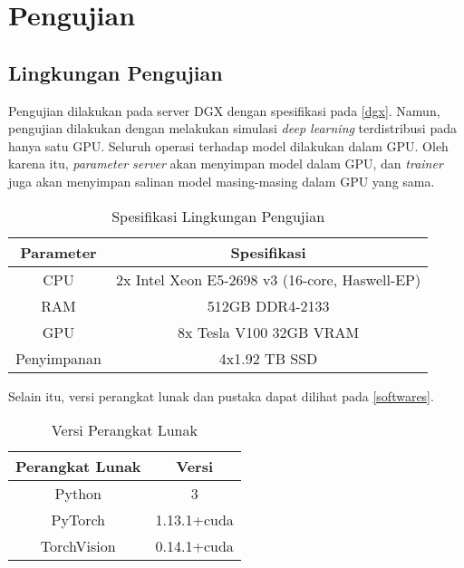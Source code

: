 \section{Pengujian}
\subsection{Lingkungan Pengujian}
Pengujian dilakukan pada server DGX dengan spesifikasi pada \autoref{dgx}. Namun, pengujian dilakukan dengan melakukan simulasi \emph{deep learning} terdistribusi pada hanya satu GPU. Seluruh operasi terhadap model dilakukan dalam GPU. Oleh karena itu, \emph{parameter server} akan menyimpan model dalam GPU, dan \emph{trainer} juga akan menyimpan salinan model masing-masing dalam GPU yang sama.

\begin{table}[H]
  \caption{Spesifikasi Lingkungan Pengujian}\label{dgx}
  \centering
  \begin{tabular}{ | c | c | }
    \hline
    \textbf{Parameter} & \textbf{Spesifikasi}                           \\
    \hline
    CPU                & 2x Intel Xeon E5-2698 v3 (16-core, Haswell-EP) \\
    \hline
    RAM                & 512GB DDR4-2133                                \\
    \hline
    GPU                & 8x Tesla V100 32GB VRAM                        \\
    \hline
    Penyimpanan        & 4x1.92 TB SSD                                  \\
    \hline
  \end{tabular}
\end{table}

Selain itu, versi perangkat lunak dan pustaka dapat dilihat pada \autoref{softwares}.
\begin{table}[H]
  \caption{Versi Perangkat Lunak}\label{softwares}
  \centering
  \begin{tabular}{ | c | c | }
    \hline
    \textbf{Perangkat Lunak} & \textbf{Versi} \\
    \hline
    Python                   & 3              \\
    \hline
    PyTorch                  & 1.13.1+cuda    \\
    \hline
    TorchVision              & 0.14.1+cuda    \\
    \hline
  \end{tabular}
\end{table}

